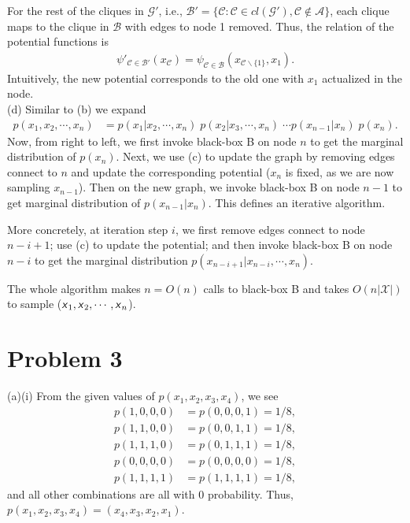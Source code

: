 \documentclass{article}
\newcommand{\s}[1]{\textsf{\textit{#1}}}
\newcommand{\qeds}{\hfill\qedsymbol}
\begin{document}
For the rest of the cliques in $\mathscr{G}'$, i.e., $\mathscr{B}' = \Big\{\mathscr{C}: \mathscr{C} \in cl(\mathscr{G}'), \mathscr{C} \not\in \mathscr{A}\Big\}$, each clique maps to the clique in $\mathscr{B}$ with edges to node 1 removed. Thus, the relation of the potential functions is
\begin{align*}
\psi'_{\mathscr{C}\in\mathscr{B}'}(x_{\mathscr{C}}) = \psi_{\mathscr{C}\in\mathscr{B}}(x_{\mathscr{C} \backslash \{1\}}, x_1).	
\end{align*}
Intuitively, the new potential corresponds to the old one with $x_1$ actualized in the node.
\\

%
\noindent
(d) Similar to (b) we expand
\begin{align*}
p(x_1, x_2, \cdots, x_n) &= p(x_1 | x_2, \cdots, x_n) \;
p(x_2 | x_3, \cdots, x_n)\; \cdots
p(x_{n-1}|x_n)\;p(x_n).
\end{align*}
Now, from right to left, we first invoke black-box B on node $n$ to get
the marginal distribution of $p(x_n)$. Next, we use (c) to update the graph
by removing edges connect to $n$ and update the corresponding potential ($x_n$ is fixed, as we are now sampling $x_{n-1}$).
Then on the new graph, we invoke black-box B on node $n-1$ to get 
marginal distribution of $p(x_{n-1}|x_n)$. This defines an iterative algorithm.

More concretely, at iteration step $i$, we first remove edges connect to
node $n - i + 1$; use (c) to update the potential; and then invoke black-box
B on node $n-i$ to get the marginal distribution $p(x_{n-i+1}|x_{n-i},
\cdots, x_n)$.

The whole algorithm makes $n=O(n)$ calls to black-box B and takes
$O(n|\mathscr{X}|)$ to sample ($\s{x}_1, \s{x}_2, \cdots, \s{x}_n$).

\pagebreak

\section*{Problem 3}
(a)(i) From the given values of $p(x_1, x_2, x_3, x_4)$, we see
\begin{align*}
p(1,0,0,0) &= p(0,0,0,1) = 1/8, \\
p(1,1,0,0) &= p(0,0,1,1) = 1/8, \\
p(1,1,1,0) &= p(0,1,1,1) = 1/8, \\
p(0,0,0,0) &= p(0,0,0,0) = 1/8, \\
p(1,1,1,1) &= p(1,1,1,1) = 1/8,
\end{align*}
and all other combinations are all with 0 probability.
Thus, $p(x_1, x_2, x_3, x_4) = (x_4, x_3, x_2, x_1)$. \qeds
\\
\end{document}
